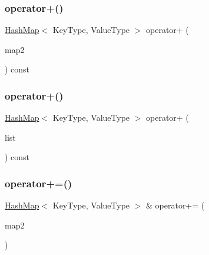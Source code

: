 \mbox{\label{classHashMap_afba7f384a875018877c06fa71f6e7b5e}} 
\subsubsection{\texorpdfstring{operator+()}{operator+()}\hspace{0.1cm}{\footnotesize\ttfamily [1/2]}}
{\footnotesize\ttfamily \mbox{\hyperlink{classHashMap}{Hash\+Map}}$<$ Key\+Type, Value\+Type $>$ operator+ (\begin{DoxyParamCaption}\item[{const \mbox{\hyperlink{classHashMap}{Hash\+Map}}$<$ Key\+Type, Value\+Type $>$ \&}]{map2 }\end{DoxyParamCaption}) const}

\mbox{\label{classHashMap_a1df496930b881491ce05d421d6924b68}} 
\subsubsection{\texorpdfstring{operator+()}{operator+()}\hspace{0.1cm}{\footnotesize\ttfamily [2/2]}}
{\footnotesize\ttfamily \mbox{\hyperlink{classHashMap}{Hash\+Map}}$<$ Key\+Type, Value\+Type $>$ operator+ (\begin{DoxyParamCaption}\item[{std\+::initializer\+\_\+list$<$ std\+::pair$<$ Key\+Type, Value\+Type $>$ $>$}]{list }\end{DoxyParamCaption}) const}

\mbox{\label{classHashMap_a24ad680f65038d2d6e9b406c8895ff29}} 
\subsubsection{\texorpdfstring{operator+=()}{operator+=()}\hspace{0.1cm}{\footnotesize\ttfamily [1/2]}}
{\footnotesize\ttfamily \mbox{\hyperlink{classHashMap}{Hash\+Map}}$<$ Key\+Type, Value\+Type $>$ \& operator+= (\begin{DoxyParamCaption}\item[{const \mbox{\hyperlink{classHashMap}{Hash\+Map}}$<$ Key\+Type, Value\+Type $>$ \&}]{map2 }\end{DoxyParamCaption})}

